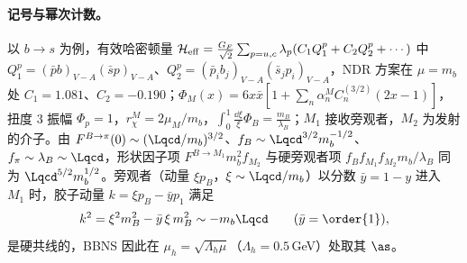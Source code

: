 \paragraph{记号与幂次计数。}
以 $b\to s$ 为例，有效哈密顿量 $\mathcal H_{\rm eff}=\frac{G_F}{\sqrt2}\sum_{p=u,c}\lambda_p(C_1Q_1^p+C_2Q_2^p+\cdots)$ 中 $Q_1^p=(\bar pb)_{V-A}(\bar sp)_{V-A}$、$Q_2^p=(\bar p_ib_j)_{V-A}(\bar s_jp_i)_{V-A}$，NDR 方案在 $\mu=m_b$ 处 $C_1=1.081$、$C_2=-0.190$\cite[表~1]{BenekeEtAl2001}；$\Phi_M(x)=6x\bar x[1+\sum_n\alpha_n^MC_n^{(3/2)}(2x-1)]$，扭度 3 振幅 $\Phi_p=1$，$r_\chi^M=2\mu_M/m_b$，$\int_0^1\frac{\dd\xi}{\xi}\Phi_B=\frac{m_B}{\lambda_B}$；$M_1$ 接收旁观者，$M_2$ 为发射的介子。由 $F^{B\to\pi}(0)\sim(\Lqcd/m_b)^{3/2}$、$f_B\sim\Lqcd^{3/2}m_b^{-1/2}$、$f_\pi\sim\lambda_B\sim\Lqcd$，形状因子项 $F^{B\to M_1}m_b^2f_{M_2}$ 与硬旁观者项 $f_Bf_{M_1}f_{M_2}m_b/\lambda_B$ 同为 $\Lqcd^{5/2}m_b^{1/2}$。旁观者（动量 $\xi p_B$，$\xi\sim\Lqcd/m_b$）以分数 $\bar y=1-y$ 进入 $M_1$ 时，胶子动量 $k=\xi p_B-\bar yp_1$ 满足
\begin{equation}\label{eq:heavy-hc-gluon}
k^2=\xi^2m_B^2-\bar y\,\xi\,m_B^2\sim-m_b\Lqcd\qquad(\bar y=\order{1}),
\end{equation}
是硬共线的，BBNS 因此在 $\mu_h=\sqrt{\Lambda_h\mu}$（$\Lambda_h=0.5$\,GeV）处取其 $\as$\cite{BenekeEtAl2001}。

